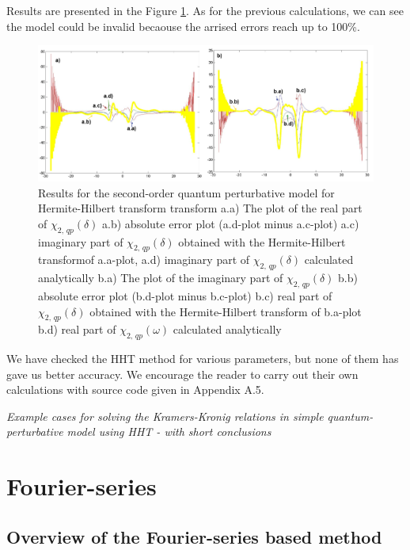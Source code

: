 \documentclass[12pt,twoside,a4paper]{article}
\numberwithin{equation}{subsection}
\numberwithin{figure}{subsection}
\begin{document}
Results are presented in the Figure \ref{fig:hht_qp2}. As for the previous calculations, we can see the model could be invalid
becaouse the arrised errors reach up to 100\%.

\begin{figure} 
  \includegraphics[width=150mm]{img/hht_qp2.png}
  \caption{Results for the second-order quantum perturbative model for Hermite-Hilbert transform transform
     a.a) The plot of the real part of ${\chi_{2, \,qp}}(\delta )$
     a.b) absolute error plot (a.d-plot minus a.c-plot)
     a.c) imaginary part of ${\chi_{2, \,qp}}(\delta )$ obtained with the Hermite-Hilbert transformof a.a-plot, 
     a.d) imaginary part of ${\chi_{2, \,qp}}(\delta )$ calculated analytically 
     b.a) The plot of the imaginary part of ${\chi_{2, \,qp}}(\delta )$ 
     b.b) absolute error plot (b.d-plot minus b.c-plot)
     b.c) real part of ${\chi_{2, \,qp}}(\delta )$ obtained with the Hermite-Hilbert transform of b.a-plot 
     b.d) real part of $\chi_{2, \,qp} (\omega )$ calculated analytically 
     \label{fig:hht_qp2}
     }
\end{figure} 

We have checked the HHT method for various parameters, but none of them has gave us better accuracy. We
encourage the reader to carry out their own calculations with source code given in Appendix A.5.

\textit{Example cases for solving the Kramers-Kronig relations in simple quantum-perturbative model using HHT - with short
conclusions}


\section{Fourier-series} \label{chap:fourier}

\subsection{Overview of the Fourier-series based method}  \label{chap:fourier_overview}
\end{document}
